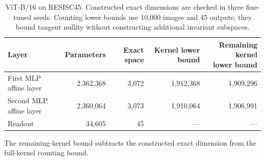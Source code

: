 \begin{table}[!htbp]\centering
\caption{ViT-B/16 on RESISC45. Constructed exact dimensions are checked in three fine-tuned seeds. Counting lower bounds use 10,000 images and 45 outputs; they bound tangent nullity without constructing additional invariant subspaces.}\label{tab:c-native-exact}
\small\begin{tabular}{lrrrr}\toprule
Layer & Parameters & Exact space & Kernel lower bound & \shortstack{Remaining kernel\\lower bound}\\\midrule
First MLP affine layer & 2,362,368 & 3,072 & 1,912,368 & 1,909,296\\
Second MLP affine layer & 2,360,064 & 3,073 & 1,910,064 & 1,906,991\\
Readout & 34,605 & 45 & --- & ---\\
\bottomrule\end{tabular}\par\smallskip\footnotesize The remaining-kernel bound subtracts the constructed exact dimension from the full-kernel counting bound.
\end{table}